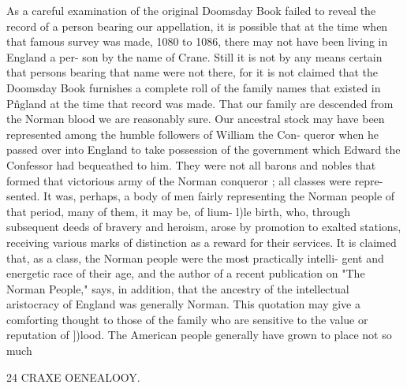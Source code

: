 As a careful examination of the original Doomsday Book failed 
to reveal the record of a person bearing our appellation, it is 
possible that at the time when that famous survey was made, 
1080 to 1086, there may not have been living in England a per- 
son by the name of Crane. Still it is not by any means certain 
that persons bearing that name were not there, for it is not 
claimed that the Doomsday Book furnishes a complete roll of the 
family names that existed in P\^ngland at the time that record was 
made. That our family are descended from the Norman blood 
we are reasonably sure. Our ancestral stock may have been 
represented among the humble followers of William the Con- 
queror when he passed over into England to take possession of 
the government which Edward the Confessor had bequeathed to 
him. They were not all barons and nobles that formed that 
victorious army of the Norman conqueror ; all classes were repre- 
sented. It was, perhaps, a body of men fairly representing the 
Norman people of that period, many of them, it may be, of lium- 
l)le birth, who, through subsequent deeds of bravery and heroism, 
arose by promotion to exalted stations, receiving various marks 
of distinction as a reward for their services. It is claimed that, 
as a class, the Norman people were the most practically intelli- 
gent and energetic race of their age, and the author of a recent 
publication on "The Norman People," says, in addition, that the 
ancestry of the intellectual aristocracy of England was generally 
Norman. This quotation may give a comforting thought to those 
of the family who are sensitive to the value or reputation of ])lood. 
The American people generally have grown to place not so much 



24 CRAXE OENEALOOY. 

